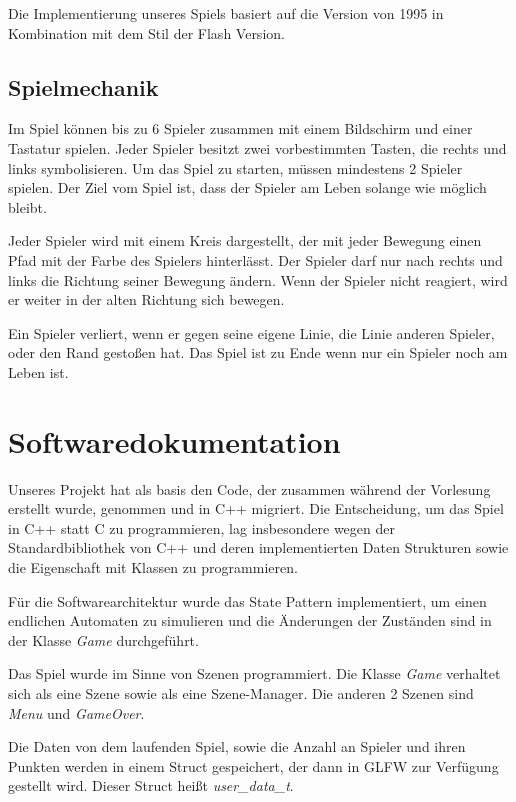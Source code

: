 \documentclass[doktyp=studarbeit]{TUBAFarbeiten}
\begin{document}
Die Implementierung unseres Spiels basiert auf die Version von 1995 in 
Kombination mit dem Stil der Flash Version.

\subsection{Spielmechanik}

Im Spiel können bis zu 6 Spieler zusammen mit einem Bildschirm und einer 
Tastatur spielen. Jeder Spieler besitzt zwei vorbestimmten Tasten, die rechts 
und links symbolisieren. Um das Spiel zu starten, müssen mindestens 
2 Spieler spielen.  Der Ziel vom Spiel ist, dass der Spieler am Leben 
solange wie möglich bleibt.

Jeder Spieler wird mit einem Kreis dargestellt, der mit jeder Bewegung einen 
Pfad mit der Farbe des Spielers hinterlässt. Der Spieler darf nur nach rechts 
und links die Richtung seiner Bewegung ändern. Wenn der Spieler nicht reagiert, 
wird er weiter in der alten Richtung sich bewegen.

Ein Spieler verliert, wenn er gegen seine eigene Linie, die Linie anderen 
Spieler,  oder den Rand gestoßen hat. Das Spiel ist zu Ende wenn nur ein 
Spieler noch am Leben ist.

\section{Softwaredokumentation}

Unseres Projekt hat als basis den Code, der zusammen während der Vorlesung 
erstellt wurde, genommen und in C++ migriert. 
Die Entscheidung, um das Spiel in C++ statt C zu programmieren, lag 
insbesondere wegen der Standardbibliothek von C++ und deren implementierten 
Daten Strukturen sowie die Eigenschaft mit Klassen zu programmieren.

Für die Softwarearchitektur wurde das State Pattern implementiert, um einen 
endlichen Automaten zu simulieren und die Änderungen der Zuständen sind in der 
Klasse \textit{Game} durchgeführt.

Das Spiel wurde im Sinne von Szenen programmiert. Die Klasse \textit{Game}
verhaltet sich als eine Szene sowie als eine Szene-Manager. Die anderen
2 Szenen sind \textit{Menu} und \textit{GameOver}.

Die Daten von dem laufenden Spiel, sowie die Anzahl an Spieler und ihren Punkten
werden in einem Struct gespeichert, der dann in GLFW zur Verfügung gestellt wird.
Dieser Struct heißt \textit{user\_data\_t}.
\end{document}
